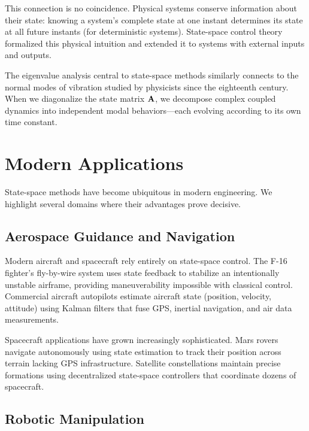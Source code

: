 This connection is no coincidence. Physical systems conserve information about their state: knowing a system's complete state at one instant determines its state at all future instants (for deterministic systems). State-space control theory formalized this physical intuition and extended it to systems with external inputs and outputs.

The eigenvalue analysis central to state-space methods similarly connects to the normal modes of vibration studied by physicists since the eighteenth century. When we diagonalize the state matrix $\mathbf{A}$, we decompose complex coupled dynamics into independent modal behaviors---each evolving according to its own time constant.

\section{Modern Applications}

State-space methods have become ubiquitous in modern engineering. We highlight several domains where their advantages prove decisive.

\subsection{Aerospace Guidance and Navigation}

Modern aircraft and spacecraft rely entirely on state-space control. The F-16 fighter's fly-by-wire system uses state feedback to stabilize an intentionally unstable airframe, providing maneuverability impossible with classical control. Commercial aircraft autopilots estimate aircraft state (position, velocity, attitude) using Kalman filters that fuse GPS, inertial navigation, and air data measurements.

Spacecraft applications have grown increasingly sophisticated. Mars rovers navigate autonomously using state estimation to track their position across terrain lacking GPS infrastructure. Satellite constellations maintain precise formations using decentralized state-space controllers that coordinate dozens of spacecraft.

\subsection{Robotic Manipulation}

